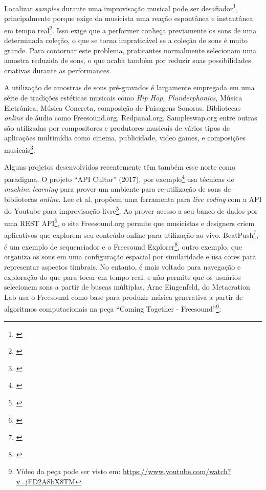Localizar \emph{samples} durante uma improvisação musical pode ser desafiador\footnote{\cite{Xambo2018}}, principalmente porque exige da musicista uma reação espontânea e instantânea em tempo real\footnote{\cite{canonne2011model}}. Isso exige que a performer conheça previamente os sons de uma determinada coleção, o que se torna impraticável se a coleção de sons é muito grande. Para contornar este problema, praticantes normalmente selecionam uma amostra reduzida de sons, o que acaba também por reduzir suas possibilidades criativas durante as performances.


A utilização de amostras de sons pré-gravados é largamente empregada em uma série de tradições estéticas musicais como \emph{Hip Hop, Plunderphonics}, Música Eletrônica, Música Concreta, composição de Paisagens Sonoras. Bibliotecas \emph{online} de áudio como Freesound.org, Redpanal.org, Sampleswap.org entre outras são utilizadas por compositores e produtores musicais de vários tipos de aplicações multimídia como cinema, publicidade, video games, e composições musicais\footnote{\cite{Roma2013}}. 

Alguns projetos desenvolvidos recentemente têm também esse norte como paradigma. O projeto ``API Cultor'' (2017), por exemplo\footnote{\cite{Ordiales2017}} usa técnicas de \emph{machine learning} para prover um ambiente para re-utilização de sons de bibliotecas \emph{online}. Lee et al. propõem uma ferramenta para \emph{live coding} com a API do Youtube para improvisação livre\footnote{\cite{Lee}}. Ao prover acesso a seu banco de dados por uma REST API\footnote{\cite{Akkermans2011}}, o site Freesound.org permite que musicistas e designers criem aplicativos que explorem seu conteúdo online para utilização ao vivo. BeatPush\footnote{\cite{Feenstra2016}}, é um exemplo de sequenciador e o Freesound Explorer\footnote{\cite{Font2016}}, outro exemplo, que organiza os sons em uma configuração espacial por similaridade e usa cores para representar aspectos timbrais. No entanto, é mais voltado para navegação e exploração do que para tocar em tempo real, e não permite que os usuários selecionem sons a partir de buscas múltiplas. Arne Eingenfeld, do Metacration Lab usa o Freesound como base para produzir música generativa a partir de algoritmos computacionais na peça ``Coming Together - Freesound''\footnote{Vídeo da peça pode ser visto em: \url{https://www.youtube.com/watch?v=jFD2A8bX8TM}}:

